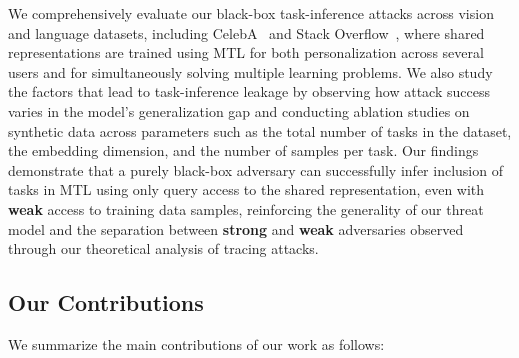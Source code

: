 
We comprehensively evaluate our black-box task-inference attacks across vision and language datasets, including CelebA~\cite{liu-2015-celeba} and Stack Overflow~\cite{stackoverflow}, where shared representations are trained using MTL for both personalization across several users and for simultaneously solving multiple learning problems. We also study the factors that lead to task-inference leakage by observing how attack success varies in the model's generalization gap and conducting ablation studies on synthetic data across parameters such as the total number of tasks in the dataset, the embedding dimension, and the number of samples per task. Our findings demonstrate that a purely black-box adversary can successfully infer inclusion of tasks in MTL using only query access to the shared representation, even with \textbf{weak} access to training data samples, reinforcing the generality of our threat model and the separation between \textbf{strong} and \textbf{weak} adversaries observed through our theoretical analysis of tracing attacks.

\subsection*{Our Contributions} We summarize the main contributions of our work as follows:

